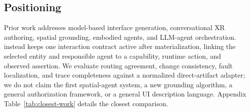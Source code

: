 \subsection{Positioning}

Prior work addresses model-based interface generation, conversational XR
authoring, spatial grounding, embodied agents, and LLM-agent orchestration.
\systemname{} instead keeps one interaction contract active after
materialization, linking the selected entity and responsible agent to a
capability, runtime action, and observed assertion. We evaluate routing
agreement, change consistency, fault localization, and trace completeness
against a normalized direct-artifact adapter; we do not claim the first
spatial-agent system, a new grounding algorithm, a general authorization
framework, or a general UI description language. Appendix
Table~\ref{tab:closest-work} details the closest comparison.
